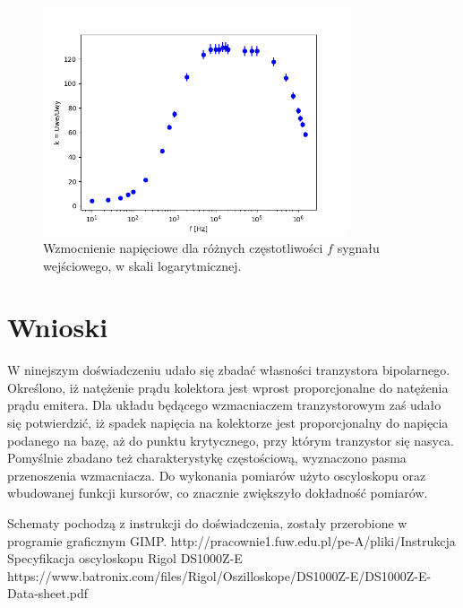 \documentclass[10pt,a4paper]{article}
\begin{document}
\begin{figure}[ht!]	
	\begin{center}
		\includegraphics[width = 0.8\textwidth]{Figure_3.png}
		\caption{Wzmocnienie napięciowe dla różnych częstotliwości $f$ sygnału wejściowego, w skali logarytmicznej.}
		\label{fig_3}
	\end{center}
\end{figure}	

\section*{Wnioski}
W ninejszym doświadczeniu udało się zbadać własności tranzystora bipolarnego. Określono, iż natężenie prądu kolektora jest wprost proporcjonalne do natężenia prądu emitera. Dla układu będącego wzmacniaczem tranzystorowym zaś udało się potwierdzić, iż spadek napięcia na kolektorze jest proporcjonalny do napięcia podanego na bazę, aż do punktu krytycznego, przy którym tranzystor się nasyca. Pomyślnie zbadano też charakterystykę częstościową, wyznaczono pasma przenoszenia wzmacniacza. Do wykonania pomiarów użyto oscyloskopu oraz wbudowanej funkcji kursorów, co znacznie zwiększyło dokładność pomiarów. 

\begin{thebibliography}{}
	 Schematy pochodzą z instrukcji do doświadczenia, zostały przerobione w programie graficznym GIMP. http://pracownie1.fuw.edu.pl/pe-A/pliki/Instrukcja%
	 Specyfikacja oscyloskopu Rigol DS1000Z-E https://www.batronix.com/files/Rigol/Oszilloskope/DS1000Z-E/DS1000Z-E-Data-sheet.pdf
\end{thebibliography}
\end{document}
